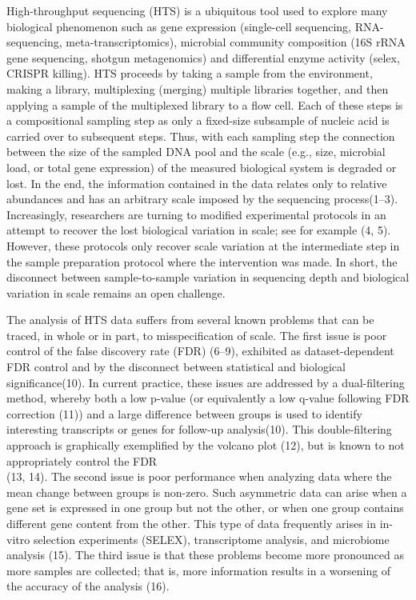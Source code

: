 \documentclass[
]{article}
\begin{document}
High-throughput sequencing (HTS) is a ubiquitous tool used to explore
many biological phenomenon such as gene expression (single-cell
sequencing, RNA-sequencing, meta-transcriptomics), microbial community
composition (16S rRNA gene sequencing, shotgun metagenomics) and
differential enzyme activity (selex, CRISPR killing). HTS proceeds by
taking a sample from the environment, making a library, multiplexing
(merging) multiple libraries together, and then applying a sample of the
multiplexed library to a flow cell. Each of these steps is a
compositional sampling step as only a fixed-size subsample of nucleic
acid is carried over to subsequent steps. Thus, with each sampling step
the connection between the size of the sampled DNA pool and the scale
(e.g., size, microbial load, or total gene expression) of the measured
biological system is degraded or lost. In the end, the information
contained in the data relates only to relative abundances and has an
arbitrary scale imposed by the sequencing process(1--3). Increasingly,
researchers are turning to modified experimental protocols in an attempt
to recover the lost biological variation in scale; see for example (4,
5). However, these protocols only recover scale variation at the
intermediate step in the sample preparation protocol where the
intervention was made. In short, the disconnect between sample-to-sample
variation in sequencing depth and biological variation in scale remains
an open challenge.

The analysis of HTS data suffers from several known problems that can be
traced, in whole or in part, to misspecification of scale. The first
issue is poor control of the false discovery rate (FDR) (6--9),
exhibited as dataset-dependent FDR control and by the disconnect between
statistical and biological significance(10). In current practice, these
issues are addressed by a dual-filtering method, whereby both a low
p-value (or equivalently a low q-value following FDR correction (11))
and a large difference between groups is used to identify interesting
transcripts or genes for follow-up analysis(10). This double-filtering
approach is graphically exemplified by the volcano plot (12), but is
known to not appropriately control the FDR\\
(13, 14). The second issue is poor performance when analyzing data where
the mean change between groups is non-zero. Such asymmetric data can
arise when a gene set is expressed in one group but not the other, or
when one group contains different gene content from the other. This type
of data frequently arises in in-vitro selection experiments (SELEX),
transcriptome analysis, and microbiome analysis (15). The third issue is
that these problems become more pronounced as more samples are
collected; that is, more information results in a worsening of the
accuracy of the analysis (16).
\end{document}
